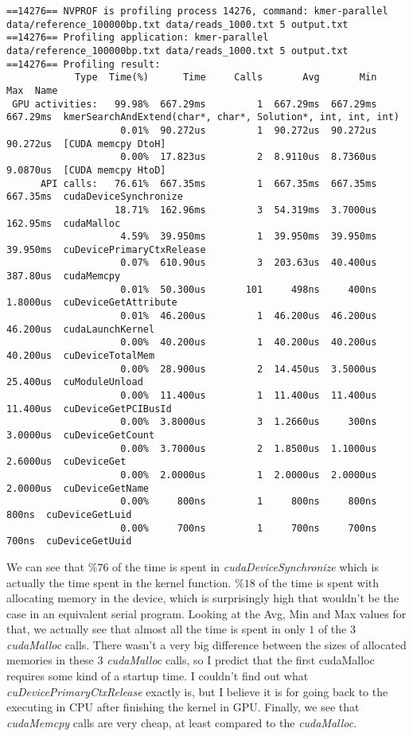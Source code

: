 \documentclass{article}
\begin{document}
\begin{lstlisting}
==14276== NVPROF is profiling process 14276, command: kmer-parallel data/reference_100000bp.txt data/reads_1000.txt 5 output.txt
==14276== Profiling application: kmer-parallel data/reference_100000bp.txt data/reads_1000.txt 5 output.txt
==14276== Profiling result:
            Type  Time(%)      Time     Calls       Avg       Min       Max  Name
 GPU activities:   99.98%  667.29ms         1  667.29ms  667.29ms  667.29ms  kmerSearchAndExtend(char*, char*, Solution*, int, int, int)
                    0.01%  90.272us         1  90.272us  90.272us  90.272us  [CUDA memcpy DtoH]
                    0.00%  17.823us         2  8.9110us  8.7360us  9.0870us  [CUDA memcpy HtoD]
      API calls:   76.61%  667.35ms         1  667.35ms  667.35ms  667.35ms  cudaDeviceSynchronize
                   18.71%  162.96ms         3  54.319ms  3.7000us  162.95ms  cudaMalloc
                    4.59%  39.950ms         1  39.950ms  39.950ms  39.950ms  cuDevicePrimaryCtxRelease
                    0.07%  610.90us         3  203.63us  40.400us  387.80us  cudaMemcpy
                    0.01%  50.300us       101     498ns     400ns  1.8000us  cuDeviceGetAttribute
                    0.01%  46.200us         1  46.200us  46.200us  46.200us  cudaLaunchKernel
                    0.00%  40.200us         1  40.200us  40.200us  40.200us  cuDeviceTotalMem
                    0.00%  28.900us         2  14.450us  3.5000us  25.400us  cuModuleUnload
                    0.00%  11.400us         1  11.400us  11.400us  11.400us  cuDeviceGetPCIBusId
                    0.00%  3.8000us         3  1.2660us     300ns  3.0000us  cuDeviceGetCount
                    0.00%  3.7000us         2  1.8500us  1.1000us  2.6000us  cuDeviceGet
                    0.00%  2.0000us         1  2.0000us  2.0000us  2.0000us  cuDeviceGetName
                    0.00%     800ns         1     800ns     800ns     800ns  cuDeviceGetLuid
                    0.00%     700ns         1     700ns     700ns     700ns  cuDeviceGetUuid
\end{lstlisting}
We can see that $\%76$ of the time is spent in \emph{cudaDeviceSynchronize} which is actually the time spent in the kernel function. $\%18$ of the time is spent with allocating memory in the device, which is surprisingly high that wouldn't be the case in an equivalent serial program. Looking at the Avg, Min and Max values for that, we actually see that almost all the time is spent in only $1$ of the $3$ \emph{cudaMalloc} calls. There wasn't a very big difference between the sizes of allocated memories in these $3$ \emph{cudaMalloc} calls, so I predict that the first cudaMalloc requires some kind of a startup time. I couldn't find out what \emph{cuDevicePrimaryCtxRelease} exactly is, but I believe it is for going back to the executing in CPU after finishing the kernel in GPU. Finally, we see that \emph{cudaMemcpy} calls are very cheap, at least compared to the \emph{cudaMalloc}. \\
\end{document}
